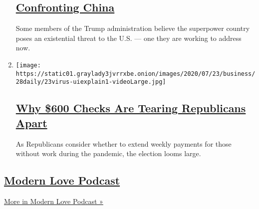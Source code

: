 \begin{enumerate}
  \hypertarget{confronting-china}{%
  \subsection{\texorpdfstring{\href{/2020/07/29/podcasts/the-daily/china-trump-foreign-policy.html}{Confronting
  China}}{Confronting China}}\label{confronting-china}}

  Some members of the Trump administration believe the superpower
  country poses an existential threat to the U.S. --- one they are
  working to address now.
\item
  \texttt{[image: https://static01.graylady3jvrrxbe.onion/images/2020/07/23/business/28daily/23virus-uiexplain1-videoLarge.jpg]}

  \hypertarget{why-600-checks-are-tearing-republicans-apart}{%
  \subsection{\texorpdfstring{\href{/2020/07/28/podcasts/the-daily/unemployment-benefits-coronavirus.html}{Why
  \$600 Checks Are Tearing Republicans
  Apart}}{Why \$600 Checks Are Tearing Republicans Apart}}\label{why-600-checks-are-tearing-republicans-apart}}

  As Republicans consider whether to extend weekly payments for those
  without work during the pandemic, the election looms large.
\end{enumerate}

\hypertarget{modern-love-podcast-1}{%
\subsection{\texorpdfstring{\href{/column/modern-love-podcast}{Modern
Love Podcast}}{Modern Love Podcast}}\label{modern-love-podcast-1}}

\href{/column/modern-love-podcast}{More in Modern Love Podcast »}

